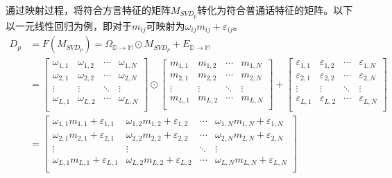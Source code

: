 \documentclass[lang=cn,cite=super]{elegantpaper}
\begin{document}
通过映射过程，将符合方言特征的矩阵$M_{SVD_p}$转化为符合普通话特征的矩阵。以下以一元线性回归为例，即对于$m_{ij}$可映射为$\omega_{ij}m_{ij}+\varepsilon_{ij}$。
\begin{equation}
\begin{aligned}
    D_p &= F(M_{SVD_p}) = \Omega_{\mathbb{D}\rightarrow  \mathbb{M}} \odot M_{SVD_p} + E_{\mathbb{D}\rightarrow \mathbb{M}} \\
    &= \begin{bmatrix}
        \omega_{1,1} & \omega_{1,2} & \cdots & \omega_{1,N} \\
        \omega_{2,1} & \omega_{2,2} & \cdots & \omega_{2,N} \\
        \vdots & \vdots & \ddots & \vdots \\
        \omega_{L,1} & \omega_{L,2} & \cdots & \omega_{L,N}\\
    \end{bmatrix} \odot \begin{bmatrix}
        m_{1,1} & m_{1,2} & \cdots & m_{1,N} \\
        m_{2,1} & m_{2,2} & \cdots & m_{2,N} \\
        \vdots & \vdots & \ddots & \vdots \\
        m_{L,1} & m_{L,2} & \cdots & m_{L,N}\\
    \end{bmatrix} + \begin{bmatrix}
        \varepsilon_{1,1} & \varepsilon_{1,2} & \cdots & \varepsilon_{1,N} \\
        \varepsilon_{2,1} & \varepsilon_{2,2} & \cdots & \varepsilon_{2,N} \\
        \vdots & \vdots & \ddots & \vdots \\
        \varepsilon_{L,1} & \varepsilon_{L,2} & \cdots & \varepsilon_{L,N}\\
    \end{bmatrix}\\
    &= \begin{bmatrix}
        \omega_{1,1}m_{1,1}+\varepsilon_{1,1} & \omega_{1,2}m_{1,2}+\varepsilon_{1,2} & \cdots & \omega_{1,N}m_{1,N}+\varepsilon_{1,N} \\
        \omega_{2,1}m_{2,1}+\varepsilon_{2,1} & \omega_{2,2}m_{2,2}+\varepsilon_{2,2} & \cdots & \omega_{2,N}m_{2,N}+\varepsilon_{2,N} \\
        \vdots & \vdots & \ddots & \vdots \\
        \omega_{L,1}m_{L,1}+\varepsilon_{L,1} & \omega_{L,2}m_{L,2}+\varepsilon_{L,2} & \cdots & \omega_{L,N}m_{L,N}+\varepsilon_{L,N}\\
    \end{bmatrix}
\end{aligned}
\end{equation}
\end{document}
